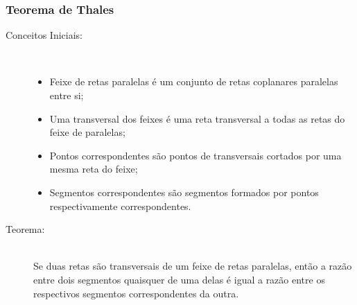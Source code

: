     \subsubsection{Teorema de Thales}
        \begin{description}
            \item[Conceitos Iniciais:] \hfill \\
                \begin{itemize}
                    \item Feixe de retas paralelas é um conjunto de retas coplanares paralelas entre si;
                    \item Uma transversal dos feixes é uma reta transversal a todas as retas do feixe de paralelas;
                    \item Pontos correspondentes são pontos de transversais cortados por uma mesma reta do feixe;
                    \item Segmentos correspondentes são segmentos formados por pontos respectivamente correspondentes.
                \end{itemize}
            \item[Teorema:] \hfill \\
                Se duas retas são transversais de um feixe de retas paralelas, então a razão entre dois segmentos quaisquer de uma delas é igual a razão entre os respectivos segmentos correspondentes da outra. \eg
                \begin{center}
\end{center}
\end{description}
